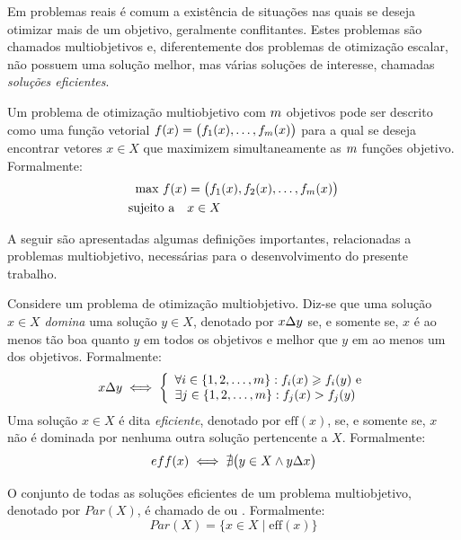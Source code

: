 

Em problemas reais é comum a existência de situações nas quais se
deseja otimizar mais de um objetivo, geralmente conflitantes.
Estes problemas são chamados multiobjetivos e,
diferentemente dos problemas de otimização escalar,
não possuem uma solução melhor, mas várias
soluções de interesse, chamadas \emph{soluções eficientes}.

Um problema de otimização multiobjetivo com $m$ objetivos pode ser descrito como uma
função vetorial $f(x) = \big(f_1(x), \ldots, f_{m}(x)\big)$
para a qual se deseja encontrar vetores $x \in X$
que maximizem simultaneamente as $m$ funções objetivo.
Formalmente:
\begin{align*}
  \text{max} ~ f(x) &=
    \big(f_1(x)
    ,f_2(x)
    ,\ldots
    ,f_{m}(x)\big) \\
  \text{sujeito a} \quad & x \in X
\end{align*}

A seguir são apresentadas algumas definições importantes, relacionadas a problemas multiobjetivo,
necessárias para o desenvolvimento do presente trabalho.

\begin{mydef}
Considere um problema de otimização multiobjetivo.
Diz-se que uma solução $x \in X$
\emph{domina} uma solução $y \in X$, denotado por $x \Delta y$
se, e somente se, $x$ é ao menos tão boa quanto
$y$ em todos os objetivos e melhor que $y$ em ao menos um dos objetivos.
Formalmente:
\begin{equation}
    x \Delta y \iff \left\{
      \begin{array}{l}
          \forall i \in \{1, 2, \ldots, m\}: f_i(x) \geqslant f_i(y) ~\text{e}\\
          \exists j \in \{1, 2, \ldots, m\}: f_j(x) > f_j(y)
  \end{array} \right.
  \label{eq:dom}
\end{equation}
Uma solução $x \in X$ é dita \emph{eficiente}, denotado por $\text{eff}(x)$,
se, e somente se, $x$ não é dominada por nenhuma outra solução pertencente a $X$.
Formalmente:
\begin{displaymath}
  eff(x) \iff \nexists \big(y \in X \wedge y \Delta x \big)
\end{displaymath}

O conjunto de todas as soluções eficientes de um problema multiobjetivo,
denotado por $Par(X)$, é chamado de \emph{\paretoset{}} ou \emph{\paretosetII{}}.
Formalmente:
\begin{displaymath}
  Par(X) = \{ x \in X \;|\; \text{eff}(x)\}
\end{displaymath}
\end{mydef}


